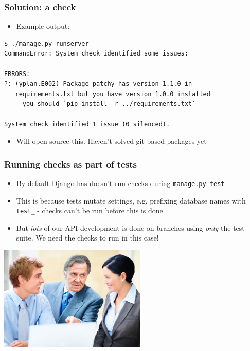 \documentclass{beamer}
\begin{document}
\begin{frame}[fragile]\frametitle{Solution: a check}

    \begin{itemize}
        \item Example output:
    \end{itemize}

    \begin{lstlisting}
$ ./manage.py runserver
CommandError: System check identified some issues:

ERRORS:
?: (yplan.E002) Package patchy has version 1.1.0 in
   requirements.txt but you have version 1.0.0 installed
   - you should `pip install -r ../requirements.txt`

System check identified 1 issue (0 silenced).
    \end{lstlisting}

    \begin{itemize}
        \item Will open-source this. Haven't solved git-based packages yet
    \end{itemize}

\end{frame}


\begin{frame}[fragile]\frametitle{Running checks as part of tests}

    \begin{itemize}
        \item By default Django has doesn't run checks during \texttt{manage.py test}
        \item This is because tests mutate settings, e.g. prefixing database names with \texttt{test\_} - checks can't be run before this is done
        \item But \textit{lots} of our API development is done on branches using \textit{only} the test suite. We need the checks to run in this case!
    \end{itemize}


    \begin{center}
        \includegraphics[width=7cm]{pointing}
    \end{center}

\end{frame}
\end{document}
